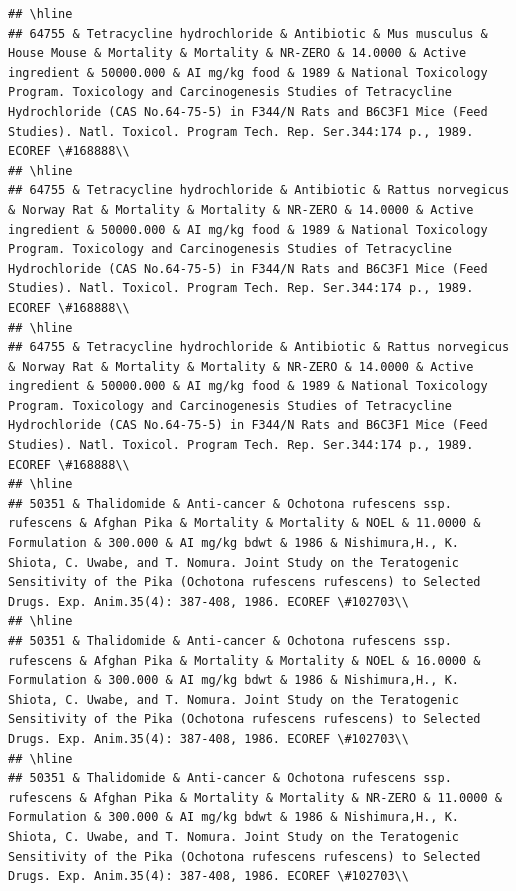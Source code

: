 \documentclass[12pt,]{article}
\begin{document}
\begin{verbatim}
## \hline
## 64755 & Tetracycline hydrochloride & Antibiotic & Mus musculus & House Mouse & Mortality & Mortality & NR-ZERO & 14.0000 & Active ingredient & 50000.000 & AI mg/kg food & 1989 & National Toxicology Program. Toxicology and Carcinogenesis Studies of Tetracycline Hydrochloride (CAS No.64-75-5) in F344/N Rats and B6C3F1 Mice (Feed Studies). Natl. Toxicol. Program Tech. Rep. Ser.344:174 p., 1989. ECOREF \#168888\\
## \hline
## 64755 & Tetracycline hydrochloride & Antibiotic & Rattus norvegicus & Norway Rat & Mortality & Mortality & NR-ZERO & 14.0000 & Active ingredient & 50000.000 & AI mg/kg food & 1989 & National Toxicology Program. Toxicology and Carcinogenesis Studies of Tetracycline Hydrochloride (CAS No.64-75-5) in F344/N Rats and B6C3F1 Mice (Feed Studies). Natl. Toxicol. Program Tech. Rep. Ser.344:174 p., 1989. ECOREF \#168888\\
## \hline
## 64755 & Tetracycline hydrochloride & Antibiotic & Rattus norvegicus & Norway Rat & Mortality & Mortality & NR-ZERO & 14.0000 & Active ingredient & 50000.000 & AI mg/kg food & 1989 & National Toxicology Program. Toxicology and Carcinogenesis Studies of Tetracycline Hydrochloride (CAS No.64-75-5) in F344/N Rats and B6C3F1 Mice (Feed Studies). Natl. Toxicol. Program Tech. Rep. Ser.344:174 p., 1989. ECOREF \#168888\\
## \hline
## 50351 & Thalidomide & Anti-cancer & Ochotona rufescens ssp. rufescens & Afghan Pika & Mortality & Mortality & NOEL & 11.0000 & Formulation & 300.000 & AI mg/kg bdwt & 1986 & Nishimura,H., K. Shiota, C. Uwabe, and T. Nomura. Joint Study on the Teratogenic Sensitivity of the Pika (Ochotona rufescens rufescens) to Selected Drugs. Exp. Anim.35(4): 387-408, 1986. ECOREF \#102703\\
## \hline
## 50351 & Thalidomide & Anti-cancer & Ochotona rufescens ssp. rufescens & Afghan Pika & Mortality & Mortality & NOEL & 16.0000 & Formulation & 300.000 & AI mg/kg bdwt & 1986 & Nishimura,H., K. Shiota, C. Uwabe, and T. Nomura. Joint Study on the Teratogenic Sensitivity of the Pika (Ochotona rufescens rufescens) to Selected Drugs. Exp. Anim.35(4): 387-408, 1986. ECOREF \#102703\\
## \hline
## 50351 & Thalidomide & Anti-cancer & Ochotona rufescens ssp. rufescens & Afghan Pika & Mortality & Mortality & NR-ZERO & 11.0000 & Formulation & 300.000 & AI mg/kg bdwt & 1986 & Nishimura,H., K. Shiota, C. Uwabe, and T. Nomura. Joint Study on the Teratogenic Sensitivity of the Pika (Ochotona rufescens rufescens) to Selected Drugs. Exp. Anim.35(4): 387-408, 1986. ECOREF \#102703\\

\end{verbatim}
\end{document}
